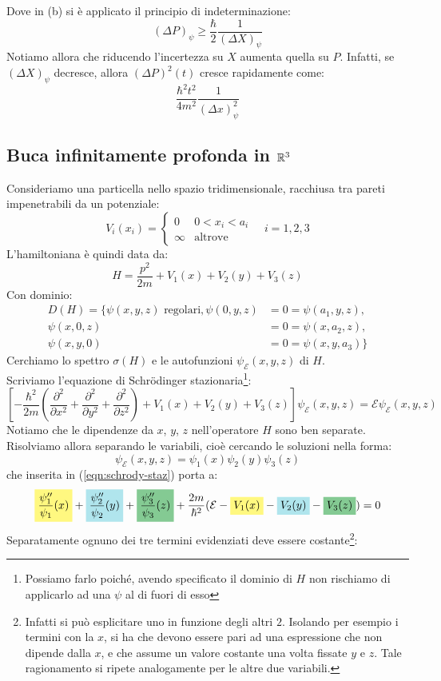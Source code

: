 \documentclass[../../FisicaTeorica.tex]{subfiles}
\begin{document}
Dove in (b) si è applicato il principio di indeterminazione: 
\[
(\Delta P)_\psi \geq \frac{\hbar}{2}\frac{1}{(\Delta X)_\psi}
\]
Notiamo allora che riducendo l'incertezza su $X$ aumenta quella su $P$. Infatti, se $(\Delta X)_\psi$ decresce, allora $(\Delta P)^2(t)$ cresce rapidamente come:
\[
\frac{\hbar^2 t^2}{4m^2}\frac{1}{(\Delta x)^2_\psi}
\]

\subsection{Buca infinitamente profonda in $\mathbb{R}^3$}
Consideriamo una particella nello spazio tridimensionale, racchiusa tra pareti impenetrabili da un potenziale:
\[
V_i(x_i)=\begin{cases}
0 & 0 < x_i < a_i\\
\infty & \text{altrove}
\end{cases}
\quad i=1,2,3
\]
L'hamiltoniana è quindi data da:
\[
H=\frac{p^2}{2m}+V_1(x)+V_2(y)+V_3(z)
\]
Con dominio:
\begin{align*}
D(H)=\{
\psi(x,y,z) \text{ regolari}, 
\psi(0,y,z)&=0=\psi(a_1,y,z),\\
\psi(x,0,z)&=0=\psi(x,a_2,z),\\
\psi(x,y,0)&=0=\psi(x,y,a_3)
\}
\end{align*}
Cerchiamo lo spettro $\sigma(H)$ e le autofunzioni $\psi_{\mathcal{E}}(x,y,z)$ di $H$.\\
Scriviamo l'equazione di Schrödinger stazionaria\footnote{Possiamo farlo poiché, avendo specificato il dominio di $H$ non rischiamo di applicarlo ad una $\psi$ al di fuori di esso}:
\begin{equation}
\left[
-\frac{\hbar^2}{2m}\left(\frac{\partial^2}{\partial x^2}+\frac{\partial^2}{\partial y^2}+\frac{\partial^2}{\partial z^2}\right )+V_1(x)+V_2(y)+V_3(z)\right]\psi_{\mathcal{E}}(x,y,z)
=\mathcal{E}\psi_{\mathcal{E}}(x,y,z)
\label{eqn:schrody-staz}
\end{equation}
Notiamo che le dipendenze da $x$, $y$, $z$ nell'operatore $H$ sono ben separate. Risolviamo allora separando le variabili, cioè cercando le soluzioni nella forma:
\[
\psi_{\mathcal{E}}(x,y,z)=\psi_1(x)\psi_2(y)\psi_3(z)
\]
che inserita in (\ref{eqn:schrody-staz}) porta a: %
\[
\hlc{Yellow}{\frac{\psi_1''}{\psi_1}(x)}+\hlc{SkyBlue}{\frac{\psi''_2}{\psi_2}(y)}+\hlc{ForestGreen}{\frac{\psi_3''}{\psi_3}(z)} + \frac{2m}{\hbar^2}(\mathcal{E} -\hlc{Yellow}{V_1(x)}-\hlc{SkyBlue}{V_2(y)}-\hlc{ForestGreen}{V_3(z)}) = 0
\]
Separatamente ognuno dei tre termini evidenziati deve essere costante\footnote{Infatti si può esplicitare uno in funzione degli altri $2$. Isolando per esempio i termini con la $x$, si ha che devono essere pari ad una espressione che non dipende dalla $x$, e che assume un valore costante una volta fissate $y$ e $z$. Tale ragionamento si ripete analogamente per le altre due variabili.}:
\end{document}

